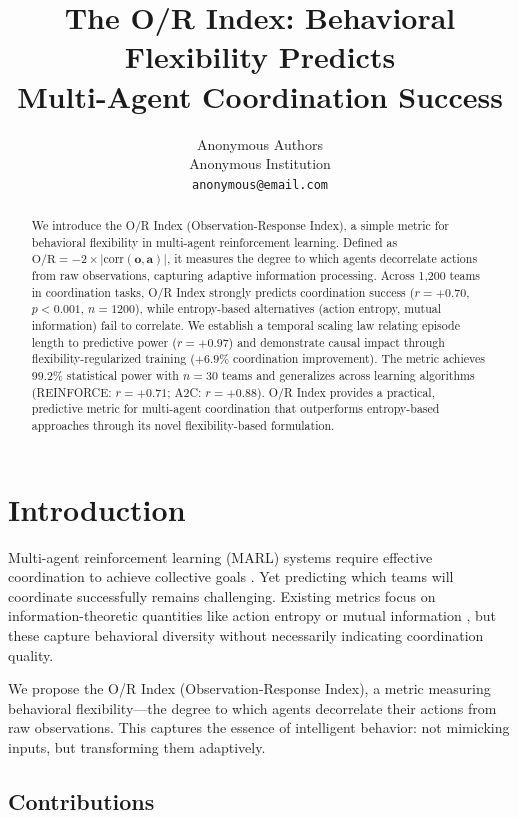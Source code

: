 \documentclass[twoside]{article}
\title{The O/R Index: Behavioral Flexibility Predicts \\Multi-Agent Coordination Success}
\author{
  Anonymous Authors\\
  Anonymous Institution\\
  \texttt{anonymous@email.com}
}
\date{}
\newcommand{\ORIndex}{O/R Index}
\begin{document}
\maketitle

\begin{abstract}
We introduce the \ORIndex{} (Observation-Response Index), a simple metric for behavioral flexibility in multi-agent reinforcement learning. Defined as $\text{O/R} = -2 \times |\text{corr}(\mathbf{o}, \mathbf{a})|$, it measures the degree to which agents decorrelate actions from raw observations, capturing adaptive information processing. Across 1,200 teams in coordination tasks, \ORIndex{} strongly predicts coordination success ($r = +0.70$, $p < 0.001$, $n = 1200$), while entropy-based alternatives (action entropy, mutual information) fail to correlate. We establish a temporal scaling law relating episode length to predictive power ($r = +0.97$) and demonstrate causal impact through flexibility-regularized training ($+6.9\%$ coordination improvement). The metric achieves $99.2\%$ statistical power with $n = 30$ teams and generalizes across learning algorithms (REINFORCE: $r = +0.71$; A2C: $r = +0.88$). \ORIndex{} provides a practical, predictive metric for multi-agent coordination that outperforms entropy-based approaches through its novel flexibility-based formulation.
\end{abstract}

\section{Introduction}

Multi-agent reinforcement learning (MARL) systems require effective coordination to achieve collective goals \citep{oroojlooyjadid2019review, hernandez2019survey}. Yet predicting which teams will coordinate successfully remains challenging. Existing metrics focus on information-theoretic quantities like action entropy or mutual information \citep{jaques2019social}, but these capture behavioral diversity without necessarily indicating coordination quality.

We propose the \ORIndex{} (Observation-Response Index), a metric measuring behavioral flexibility—the degree to which agents decorrelate their actions from raw observations. This captures the essence of intelligent behavior: not mimicking inputs, but transforming them adaptively.

\subsection{Contributions}
\end{document}

